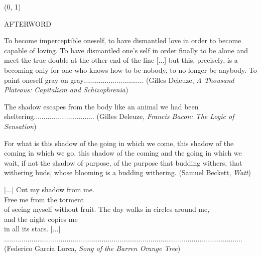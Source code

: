 \documentclass[11pt]{article}
\begin{document}
\begin{textblock}{23}(0, 1)
\begin{center}
\huge AFTERWORD
\end{center}
\end{textblock}

\begingroup
\begin{center}
To become imperceptible oneself, to have dismantled love in order to become capable of loving. To have dismantled one's self in order finally to be alone and meet the true double at the other end of the line [...] but this, precisely, is a becoming only for one who knows how to be nobody, to no longer be anybody. To paint oneself gray on gray.\color{white}..............................
\rightskip\leftskip
\phantom{text} \hfill \color{black}(Gilles Deleuze, \textit{A Thousand Plateaus: Capitalism and Schizophrenia})
\end{center}

\begin{center}
The shadow escapes from the body like an animal we had been sheltering.\color{white}..............................
\rightskip\leftskip
\phantom{text} \hfill \color{black}(Gilles Deleuze, \textit{Francis Bacon: The Logic of Sensation})
\end{center}

\begin{center}
For what is this shadow of the going in which we come, this shadow of the coming in which we go, this shadow of the coming and the going in which we wait, if not the shadow of purpose, of the purpose that budding withers, that withering buds, whose blooming is a budding withering.
\rightskip\leftskip
\phantom{text} \hfill (Samuel Beckett, \textit{Watt})
\end{center}

\begin{center}
[...] Cut my shadow from me. \\
Free me from the torment \\
of seeing myself without fruit. \newline
[...] The day walks in circles around me, \\
and the night copies me \\
in all its stars. [...] \color{white}..........................................................................................................................
\rightskip\leftskip
\phantom{text} \hfill \color{black}(Federico Garc\'ia Lorca, \textit{Song of the Barren Orange Tree})
\end{center}
\end{document}
